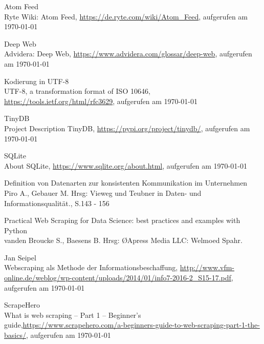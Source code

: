 \documentclass[a4paper,oneside,12pt]{report}
\begin{document}
	
	
	\clearpage
	\begin{thebibliography}{9} 
		\vspace{1.0cm}
		
		 Atom Feed\\ Ryte Wiki: Atom Feed, \newline \url{https://de.ryte.com/wiki/Atom_Feed}, aufgerufen am \today
					
		 Deep Web\\ Advidera: Deep Web, \newline \url{https://www.advidera.com/glossar/deep-web}, aufgerufen am \today	
		
		 Kodierung in UTF-8\\ UTF-8, a transformation format of ISO 10646, \newline \url{https://tools.ietf.org/html/rfc3629}, aufgerufen am \today
		
		 TinyDB\\ Project Description TinyDB, \newline \url{https://pypi.org/project/tinydb/}, aufgerufen am \today
		
		 SQLite\\ About SQLite, \newline \url{https://www.sqlite.org/about.html}, aufgerufen am \today
		
		 Definition von Datenarten zur konsistenten Kommunikation im Unternehmen\\ Piro A., Gebauer M. Hrsg: \glqq Vieweg und Teubner in Daten- und Informationsqualität.\grqq, S.143 - 156
		
		 Practical Web Scraping for Data Science: best practices and examples with Python\\ vanden Broucke S., Baesens B. Hrsg: \O Apress Media LLC: Welmoed Spahr.\grqq
		
		 Jan Seipel\\ Webscraping als Methode der Informationsbeschaffung, \newline \url{http://www.vfm-online.de/weblog/wp-content/uploads/2014/01/info7-2016-2\_S15-17.pdf}, aufgerufen am \today
		
		 ScrapeHero\\What is web scraping – Part 1 – Beginner’s guide,\newline \url{https://www.scrapehero.com/a-beginners-guide-to-web-scraping-part-1-the-basics/}, aufgerufen am \today
		

\end{thebibliography}
\end{document}
